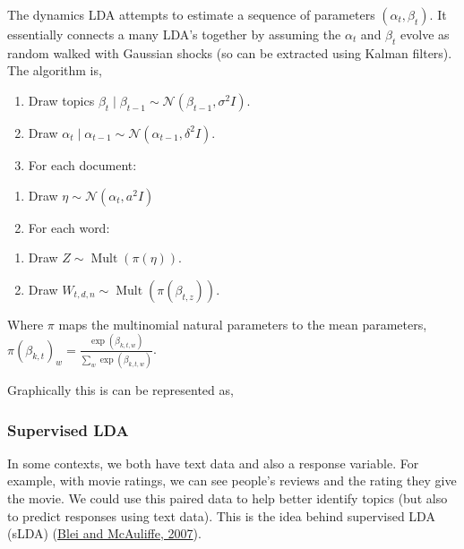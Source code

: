 \documentclass[
]{book}
\providecommand{\tightlist}{%
  \setlength{\itemsep}{0pt}\setlength{\parskip}{0pt}}
\begin{document}
The dynamics LDA attempts to estimate a sequence of parameters \((\alpha_t,\beta_t)\). It essentially connects a many LDA's together by assuming the \(\alpha_t\) and \(\beta_t\) evolve as random walked with Gaussian shocks (so can be extracted using Kalman filters). The algorithm is,

\begin{enumerate}
\def\labelenumi{\arabic{enumi}.}
\tightlist
\item
  Draw topics \(\beta_{t} \mid \beta_{t-1} \sim \mathcal{N}\left(\beta_{t-1}, \sigma^{2} I\right)\).
\item
  Draw \(\alpha_{t} \mid \alpha_{t-1} \sim \mathcal{N}\left(\alpha_{t-1}, \delta^{2} I\right)\).
\item
  For each document:
\end{enumerate}

\begin{enumerate}
\def\labelenumi{(\alph{enumi})}
\tightlist
\item
  Draw \(\eta \sim \mathcal{N}\left(\alpha_{t}, a^{2} I\right)\)
\item
  For each word:
\end{enumerate}

\begin{enumerate}
\def\labelenumi{\roman{enumi}.}
\tightlist
\item
  Draw \(Z \sim \operatorname{Mult}(\pi(\eta))\).
\item
  Draw \(W_{t, d, n} \sim \operatorname{Mult}\left(\pi\left(\beta_{t, z}\right)\right)\).
\end{enumerate}

Where \(\pi\) maps the multinomial natural parameters to the mean parameters, \(\pi\left(\beta_{k, t}\right)_{w}=\frac{\exp \left(\beta_{k, t, w}\right)}{\sum_{w} \exp \left(\beta_{k, t, w}\right)}\).

Graphically this is can be represented as,

\hypertarget{supervised-lda}{%
\subsubsection{Supervised LDA}\label{supervised-lda}}

In some contexts, we both have text data and also a response variable. For example, with movie ratings, we can see people's reviews and the rating they give the movie. We could use this paired data to help better identify topics (but also to predict responses using text data). This is the idea behind supervised LDA (sLDA) (\href{https://proceedings.neurips.cc/paper/2007/file/d56b9fc4b0f1be8871f5e1c40c0067e7-Paper.pdf}{Blei and McAuliffe, 2007}).
\end{document}
